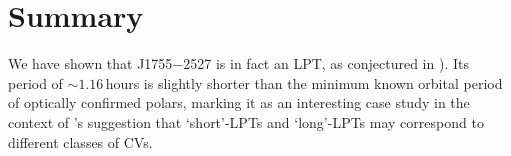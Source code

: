 \documentclass[fleqn,usenatbib]{mnras}
\newcommand{\src}{J1755$-$2527}
\begin{document}





\section{Summary} \label{sec:summary}

We have shown that \src{} is in fact an LPT, as conjectured in ).
Its period of ${\sim}1.16\,$hours is slightly shorter than the minimum known orbital period of optically confirmed polars, marking it as an interesting case study in the context of \citet{2025A&A...695L...8R}'s suggestion that `short'-LPTs and `long'-LPTs may correspond to different classes of CVs.
\end{document}
